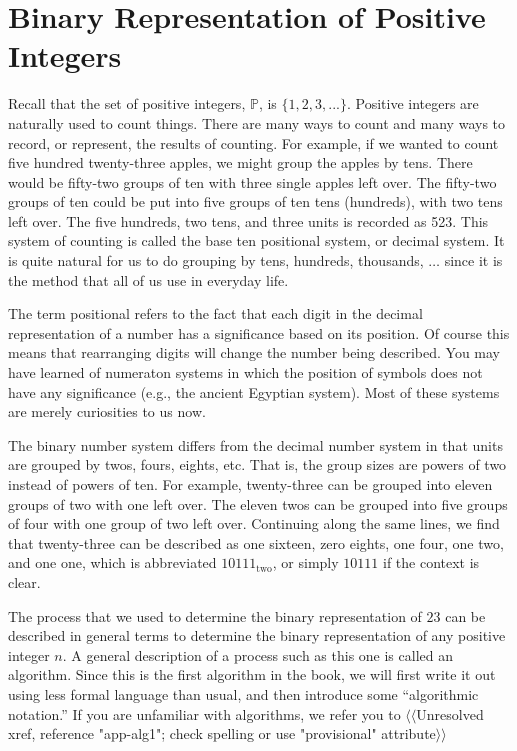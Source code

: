 \documentclass[10pt,]{book}
\theoremstyle{plain}
\theoremstyle{definition}
\theoremstyle{definition}
\theoremstyle{definition}
\theoremstyle{definition}
\begin{document}
\section[Binary Representation of Positive Integers ]{Binary Representation of Positive Integers }\label{Binary_Representation_of_Positive_Integers}
Recall that the set of positive integers, \(\mathbb{P}\), is \(\{1, 2, 3, . . . \}\). Positive integers are naturally used to count things. There are many ways to count and many ways to record, or represent, the results of counting. For example, if we wanted to count five hundred twenty-three apples, we might group the apples by tens. There would be fifty-two groups of ten with three single apples left over. The fifty-two groups of ten could be put into five groups of ten tens (hundreds), with two tens left over. The five hundreds, two tens, and three units is recorded as 523. This system of counting is called the base ten positional system, or decimal system. It is quite natural for us to do grouping by tens, hundreds, thousands, \(\dots\) since it is the method that all of us use in everyday life. %
\par
 The term positional refers to the fact that each digit in the decimal representation of a number has a significance based on its position. Of course this means that rearranging digits will change the number being described. You may have learned of numeraton systems in which the position of symbols does not have any significance (e.g., the ancient Egyptian system). Most of these systems are merely curiosities to us now.%
\par
The binary number system differs from the decimal number system in that units are grouped by twos, fours, eights, etc. That is, the group sizes are powers of two instead of powers of ten. For example, twenty-three can be grouped into eleven groups of two with one left over. The eleven twos can be grouped into five groups of four with one group of two left over. Continuing along the same lines, we find that twenty-three can be described as one sixteen, zero eights, one four, one two, and one one, which is abbreviated \(10111_{\textrm{two}}\), or simply \(10111\) if the
context is clear. %
\par
The process that we used to determine the binary representation of \(23\) can be described in general terms to determine the binary representation of any positive integer \(n\). A general description of a process such as this one is called an algorithm. Since this is the first algorithm in the book, we will first write it out using less formal language than usual, and then introduce some ``algorithmic notation.''  If you are unfamiliar with algorithms, we refer you to {$\langle\langle$Unresolved xref, reference "app-alg1"; check spelling or use "provisional" attribute$\rangle\rangle$}%
\end{document}
